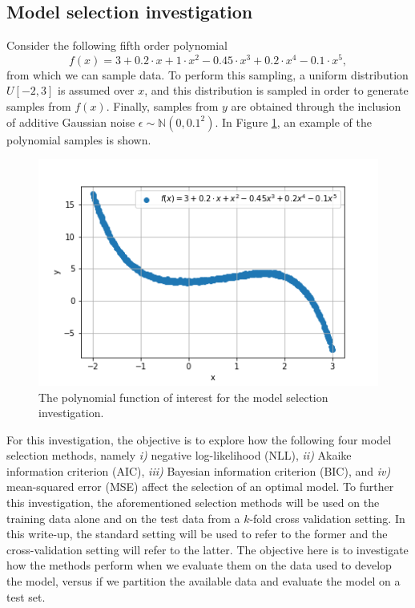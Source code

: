 \documentclass{article}
\begin{document}
\subsection{Model selection investigation}
Consider the following fifth order polynomial
\begin{equation}
    f(x) = 3 + 0.2 \cdot x + 1 \cdot x^2 -0.45 \cdot x^3 + 0.2 \cdot x^4 -0.1 \cdot x^5,
\end{equation}
from which we can sample data. To perform this sampling, a uniform distribution $U[-2, 3]$ is assumed over $x$, and this distribution is sampled in order to generate samples from $f(x)$. Finally, samples from $y$ are obtained through the inclusion of additive Gaussian noise $\epsilon\sim \mathbb{N}(0, 0.1^2)$. In Figure \ref{fig:Q2b_1}, an example of the polynomial samples is shown. 
\begin{figure}[!htb]
    \centering
    \includegraphics[scale=0.5]{Q2b_fig1.png}
    \caption{The polynomial function of interest for the model selection investigation.}
    \label{fig:Q2b_1}
\end{figure}

For this investigation, the objective is to explore how the following four model selection methods, namely \emph{i)} negative log-likelihood (NLL), \emph{ii)} Akaike information criterion (AIC), \emph{iii)} Bayesian information criterion (BIC), and \emph{iv)} mean-squared error (MSE) affect the selection of an optimal model. To further this investigation, the aforementioned selection methods will be used on the training data alone and on the test data from a $k$-fold cross validation setting. In this write-up, the standard setting will be used to refer to the former and the cross-validation setting will refer to the latter. The objective here is to investigate how the methods perform when we evaluate them on the data used to develop the model, versus if we partition the available data and evaluate the model on a test set.
\end{document}
